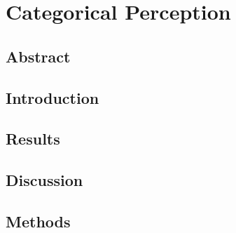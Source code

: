 \chapter{Categorical Perception}
\section{Abstract}


\section{Introduction}


\section{Results}


\section{Discussion}


\section{Methods}


\renewcommand{\figurename}{Supplementary Figure}

\renewcommand{\figurename}{Figure}

